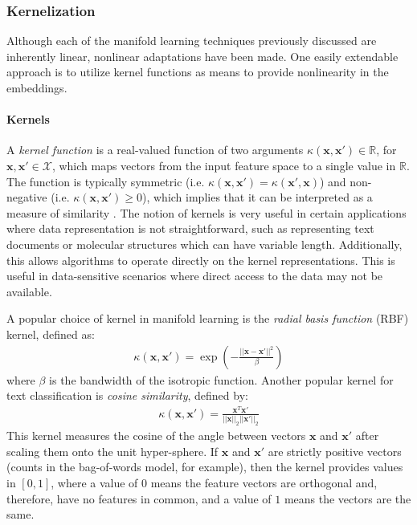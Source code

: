 \subsubsection{Kernelization}
Although each of the manifold learning techniques previously discussed are inherently linear, nonlinear adaptations have been made.  One easily extendable approach is to utilize kernel functions as means to provide nonlinearity in the embeddings. 

\paragraph{Kernels} A \textit{kernel function} is a real-valued function of two arguments $\kappa(\bm{x},\bm{x}') \in \mathbb{R}$, for $\bm{x},\bm{x}' \in \mathcal{X}$, which maps vectors from the input feature space to a single value in $\mathbb{R}$.  The function is typically symmetric (i.e.  $\kappa(\bm{x},\bm{x}') =  \kappa(\bm{x}',\bm{x})$) and non-negative (i.e.  $\kappa(\bm{x},\bm{x}') \geq 0$), which implies that it can be interpreted as a measure of similarity \citep{Murphy2012}.  The notion of kernels is very useful in certain applications where data representation is not straightforward, such as representing text documents or molecular structures which can have variable length.  Additionally, this allows algorithms to operate directly on the kernel representations.  This is useful in data-sensitive scenarios where direct access to the data may not be available.

A popular choice of kernel in manifold learning is the \textit{radial basis function} (RBF) kernel, defined as:
\begin{align}
	\kappa(\bm{x},\bm{x}') = \exp \left( - \frac{|| \bm{x} - \bm{x}' ||^{2}}{\beta} \right)
\end{align}
\noindent
where $\beta$ is the bandwidth of the isotropic function.  Another popular kernel for text classification is \textit{cosine similarity}, defined by:
\begin{align}
	\kappa(\bm{x},\bm{x}') = \frac{\bm{x}^{T}\bm{x}'}{||\bm{x}||_{2}||\bm{x}'||_{2}} 
\end{align}
\noindent
This kernel measures the cosine of the angle between vectors $\bm{x}$ and  $\bm{x}'$ after scaling them onto the unit hyper-sphere.  If  $\bm{x}$ and  $\bm{x}'$ are strictly positive vectors (counts in the bag-of-words model, for example), then the kernel provides values in $[0,1]$, where a value of $0$ means the feature vectors are orthogonal and, therefore, have no features in common, and a value of $1$ means the vectors are the same. 

